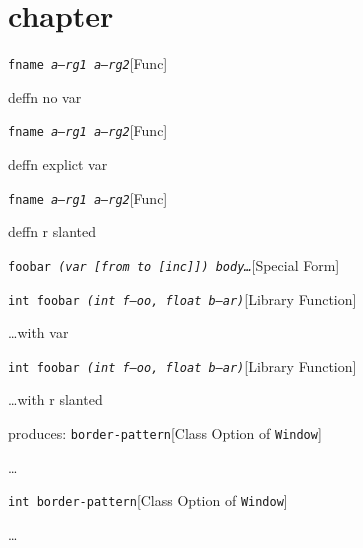 \documentclass{book}
\begin{document}
\label{anchor:Top}%
\chapter{chapter}
\label{anchor:chapter}%

\noindent\texttt{fname \bgroup{}\normalfont{}\textsl{a---rg1 a--rg2}\egroup{}}\hfill[Func]



%
deffn no var

\noindent\texttt{fname \bgroup{}\normalfont{}\textsl{\textsl{a---rg1} \textsl{a--rg2}}\egroup{}}\hfill[Func]



%
deffn explict var

\noindent\texttt{fname \bgroup{}\normalfont{}\textsl{\textrm{\textsl{a---rg1}} \textrm{\textsl{a--rg2}}}\egroup{}}\hfill[Func]



%
deffn r slanted

\noindent\texttt{foobar \bgroup{}\normalfont{}\textsl{(var {[}from to {[}inc{]}{]}) body\dots{}\@}\egroup{}}\hfill[Special Form]



%

\noindent\texttt{int foobar \bgroup{}\normalfont{}\textsl{(int \textsl{f---oo}, float \textsl{b--ar})}\egroup{}}\hfill[Library Function]



%
\dots{}\@ with var

\noindent\texttt{int foobar \bgroup{}\normalfont{}\textsl{(int \textrm{\textsl{f---oo}}, float \textrm{\textsl{b--ar}})}\egroup{}}\hfill[Library Function]



%
\dots{}\@ with r slanted

\noindent{}produces:
\noindent\texttt{border-pattern}\hfill[Class Option of \texttt{Window}]



%
\dots{}\@

\noindent\texttt{\texttt{int} border-pattern}\hfill[Class Option of \texttt{Window}]



%
\dots{}\@
\end{document}
